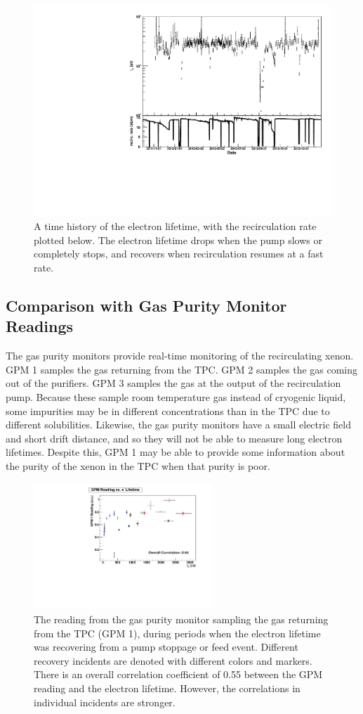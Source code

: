 \documentclass[herrin-thesis.tex]{subfiles}
\begin{document}
\begin{figure}[htb]
\centering
\includegraphics[width=0.6\columnwidth]{./plots/el_and_recirculation.pdf}
\caption[Electron lifetime history with recirculation rate]{A time history of the electron lifetime, with the recirculation rate plotted below. The electron lifetime drops when the pump slows or completely stops, and recovers when recirculation resumes at a fast rate.}
\label{fig:el_and_recirculation}
\end{figure}

\subsection{Comparison with Gas Purity Monitor Readings}
The gas purity monitors\cite{Dobi:2011zr} provide real-time monitoring of the recirculating xenon. GPM 1 samples the gas returning from the TPC. GPM 2 samples the gas coming out of the purifiers. GPM 3 samples the gas at the output of the recirculation pump. Because these sample room temperature gas instead of cryogenic liquid, some impurities may be in different concentrations than in the TPC due to different solubilities. Likewise, the gas purity monitors have a small electric field and short drift distance, and so they will not be able to measure long electron lifetimes. Despite this, GPM 1 may be able to provide some information about the purity of the xenon in the TPC when that purity is poor.

\begin{figure}[htb]
\centering
\includegraphics[width=0.6\textwidth]{./plots/el_gpm_vs_el.pdf}
\caption[GPM reading vs. electron lifetime]{The reading from the gas purity monitor sampling the gas returning from the TPC (GPM 1), during periods when the electron lifetime was recovering from a pump stoppage or feed event. Different recovery incidents are denoted with different colors and markers. There is an overall correlation coefficient of 0.55 between the GPM reading and the electron lifetime. However, the correlations in individual incidents are stronger.}
\label{fig:el_gpm_vs_el}
\end{figure}
\end{document}
